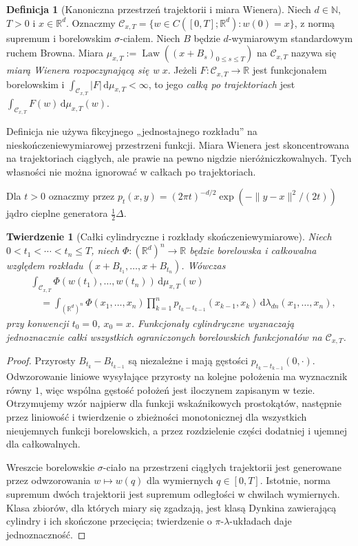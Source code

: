 \documentclass[11pt,a4paper,oneside]{report}
\numberwithin{equation}{chapter}
\theoremstyle{plain}
\newtheorem{twierdzenie}{Twierdzenie}[chapter]
\theoremstyle{definition}
\newtheorem{definicja}{Definicja}[chapter]
\theoremstyle{remark}
\newcommand{\R}{\mathbb{R}}
\newcommand{\N}{\mathbb{N}}
\newcommand{\Law}{\operatorname{Law}}
\newcommand{\calC}{\mathcal{C}}
\newcommand{\dd}{\mathrm{d}}
\begin{document}
\begin{definicja}[Kanoniczna przestrzeń trajektorii i miara Wienera]\label{def:volIII:15:01}
\label{def:path-wiener}
Niech $d\in\N$, $T>0$ i $x\in\R^d$. Oznaczmy
$\calC_{x,T}=\{w\in C([0,T];\R^d):w(0)=x\}$, z normą
supremum i borelowskim $\sigma$-ciałem. Niech $B$ będzie
$d$-wymiarowym standardowym ruchem Browna. Miara
$\mu_{x,T}:=\Law((x+B_s)_{0\le s\le T})$ na $\calC_{x,T}$
nazywa się \emph{miarą Wienera rozpoczynającą się w $x$}.
Jeżeli $F:\calC_{x,T}\to\R$ jest funkcjonałem borelowskim
i $\int_{\calC_{x,T}}|F|\,\dd\mu_{x,T}<\infty$, to jego \emph{całką
po trajektoriach} jest $\int_{\calC_{x,T}}F(w)\,\dd\mu_{x,T}(w)$.
\end{definicja}

Definicja nie używa fikcyjnego „jednostajnego rozkładu” na
nieskończeniewymiarowej przestrzeni funkcji. Miara Wienera jest
skoncentrowana na trajektoriach ciągłych, ale prawie na pewno
nigdzie nieróżniczkowalnych. Tych własności nie można ignorować
w całkach po trajektoriach.

Dla $t>0$ oznaczmy przez
$p_t(x,y)=(2\pi t)^{-d/2}\exp(-\|y-x\|^2/(2t))$
jądro cieplne generatora $\frac12\Delta$.

\begin{twierdzenie}[Całki cylindryczne i rozkłady skończeniewymiarowe]\label{thm:volIII:15:01}
\label{th:path-cylinder}
Niech $0<t_1<\cdots<t_n\le T$, niech
$\Phi:(\R^d)^n\to\R$ będzie borelowska i całkowalna
względem rozkładu $(x+B_{t_1},\ldots,x+B_{t_n})$.
Wówczas
\[
\begin{split}
 &\int_{\calC_{x,T}}\Phi(w(t_1),\ldots,w(t_n))\,
       \dd\mu_{x,T}(w)\\
 &\quad=\int_{(\R^d)^n}\Phi(x_1,\ldots,x_n)
   \prod_{k=1}^n p_{t_k-t_{k-1}}(x_{k-1},x_k)
   \,\dd\lambda_{dn}(x_1,\ldots,x_n),
\end{split}
\]
przy konwencji $t_0=0$, $x_0=x$. Funkcjonały cylindryczne
wyznaczają jednoznacznie całki wszystkich ograniczonych
borelowskich funkcjonałów na $\calC_{x,T}$.
\end{twierdzenie}
\begin{proof}
Przyrosty $B_{t_k}-B_{t_{k-1}}$ są niezależne i mają gęstości
$p_{t_k-t_{k-1}}(0,\cdot)$. Odwzorowanie liniowe wysyłające
przyrosty na kolejne położenia ma wyznacznik równy $1$,
więc wspólna gęstość położeń jest iloczynem zapisanym w tezie.
Otrzymujemy wzór najpierw dla funkcji wskaźnikowych
prostokątów, następnie przez liniowość i twierdzenie o
zbieżności monotonicznej dla wszystkich nieujemnych
funkcji borelowskich, a przez rozdzielenie części dodatniej
i ujemnej dla całkowalnych.

Wreszcie borelowskie $\sigma$-ciało na przestrzeni
ciągłych trajektorii jest generowane przez odwzorowania
$w\mapsto w(q)$ dla wymiernych $q\in[0,T]$.
Istotnie, norma supremum dwóch trajektorii jest supremum
odległości w chwilach wymiernych. Klasa zbiorów, dla
których miary się zgadzają, jest klasą Dynkina zawierającą
cylindry i ich skończone przecięcia; twierdzenie o
$\pi$-$\lambda$-układach daje jednoznaczność.
\end{proof}
\end{document}
